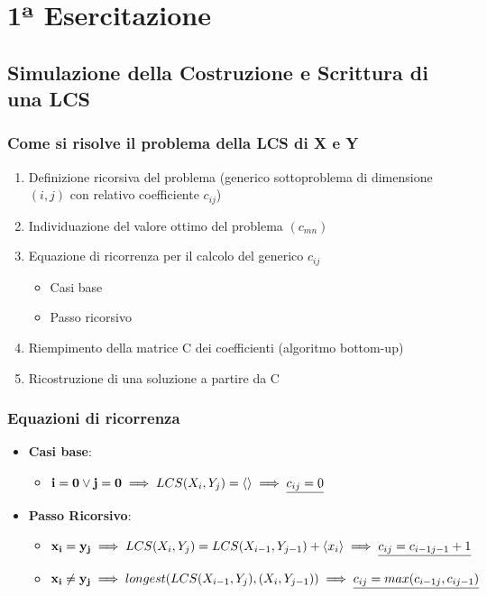 
\chapter{1ª Esercitazione}

\section{Simulazione della Costruzione e Scrittura di una LCS}

\subsection{Come si risolve il problema della LCS di X e Y}
\begin{enumerate}
    \item Definizione ricorsiva del problema (generico sottoproblema di dimensione $(i,j)$ con relativo coefficiente $c_{ij}$)
    \item Individuazione del valore ottimo del problema $(c_{mn})$
    \item Equazione di ricorrenza per il calcolo del generico $c_{ij}$
    \begin{itemize}
        \item Casi base
        \item Passo ricorsivo
    \end{itemize}
    \item Riempimento della matrice C dei coefficienti (algoritmo bottom-up)
    \item Ricostruzione di una soluzione a partire da C
\end{enumerate}

\subsection{Equazioni di ricorrenza}
\begin{itemize}
    \item \textbf{Casi base}:
    \begin{itemize}
        \item $\mathbf{i=0 \lor j=0} \implies LCS(X_i,Y_j)=\langle\rangle \implies \uline{c_{ij}=0}$
    \end{itemize}
    \item \textbf{Passo Ricorsivo}:
    \begin{itemize}
        \item $\mathbf{x_i=y_j} \implies LCS(X_i,Y_j) = LCS(X_{i-1},Y_{j-1})+ \langle x_i \rangle \implies \uline{c_{ij} = c_{i-1j-1}+1}$
        \item $\mathbf{x_i \not = y_j} \implies longest(LCS(X_{i-1}, Y_j),(X_i,Y_{j-1})) \implies \uline{c_{ij} = max(c_{i-1j},c_{ij-1})}$
    \end{itemize}
\end{itemize}

